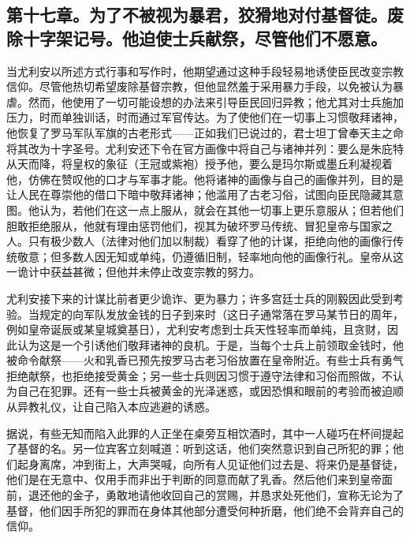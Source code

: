 \par


\subsection{第十七章。为了不被视为暴君，狡猾地对付基督徒。废除十字架记号。他迫使士兵献祭，尽管他们不愿意。}

当尤利安以所述方式行事和写作时，他期望通过这种手段轻易地诱使臣民改变宗教信仰。尽管他热切希望废除基督宗教，但他显然羞于采用暴力手段，以免被认为暴虐。然而，他使用了一切可能设想的办法来引导臣民回归异教；他尤其对士兵施加压力，时而单独训话，时而通过军官传达。为了使他们在一切事上习惯敬拜诸神，他恢复了罗马军队军旗的古老形式——正如我们已说过的，君士坦丁曾奉天主之命将其改为十字圣号。尤利安还下令在官方画像中将自己与诸神并列：要么是朱庇特从天而降，将皇权的象征（王冠或紫袍）授予他，要么是玛尔斯或墨丘利凝视着他，仿佛在赞叹他的口才与军事才能。他将诸神的画像与自己的画像并列，目的是让人民在尊崇他的借口下暗中敬拜诸神；他滥用了古老习俗，试图向臣民隐藏其意图。他认为，若他们在这一点上服从，就会在其他一切事上更乐意服从；但若他们胆敢拒绝服从，他就有理由惩罚他们，视其为破坏罗马传统、冒犯皇帝与国家之人。只有极少数人（法律对他们加以制裁）看穿了他的计谋，拒绝向他的画像行传统敬意；但多数人因无知或单纯，仍遵循旧制，轻率地向他的画像行礼。皇帝从这一诡计中获益甚微；但他并未停止改变宗教的努力。\par

尤利安接下来的计谋比前者更少诡诈、更为暴力；许多宫廷士兵的刚毅因此受到考验。当规定的向军队发放金钱的日子到来时（这日子通常落在罗马某节日的周年，例如皇帝诞辰或某皇城奠基日），尤利安考虑到士兵天性轻率而单纯，且贪财，因此认为这是一个引诱他们敬拜诸神的良机。于是，当每个士兵上前领取金钱时，他被命令献祭——火和乳香已预先按罗马古老习俗放置在皇帝附近。有些士兵有勇气拒绝献祭，也拒绝接受黄金；另一些士兵则因习惯于遵守法律和习俗而照做，不认为自己在犯罪。还有一些士兵被黄金的光泽迷惑，或因恐惧和眼前的考验而被迫顺从异教礼仪，让自己陷入本应逃避的诱惑。\par

据说，有些无知而陷入此罪的人正坐在桌旁互相饮酒时，其中一人碰巧在杯间提起了基督的名。另一位宾客立刻喊道：听到这话，他们突然意识到自己所犯的罪；他们起身离席，冲到街上，大声哭喊，向所有人见证他们过去是、将来仍是基督徒，他们是在无意中、仅用手而非出于判断的同意而献了乳香。然后他们来到皇帝面前，退还他的金子，勇敢地请他收回自己的赏赐，并恳求处死他们，宣称无论为了基督，他们因手所犯的罪而在身体其他部分遭受何种折磨，他们绝不会背弃自己的信仰。\par

